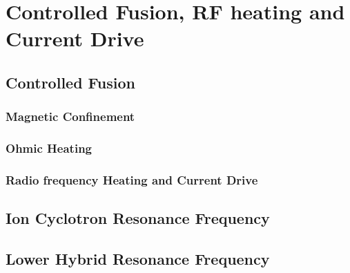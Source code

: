 
\chapter{Controlled Fusion, RF heating and Current Drive}

\section{Controlled Fusion}



\subsection{Magnetic Confinement}

\subsection{Ohmic Heating}

\subsection{Radio frequency Heating and Current Drive}
\section{Ion Cyclotron Resonance Frequency}

\section{Lower Hybrid Resonance Frequency}


